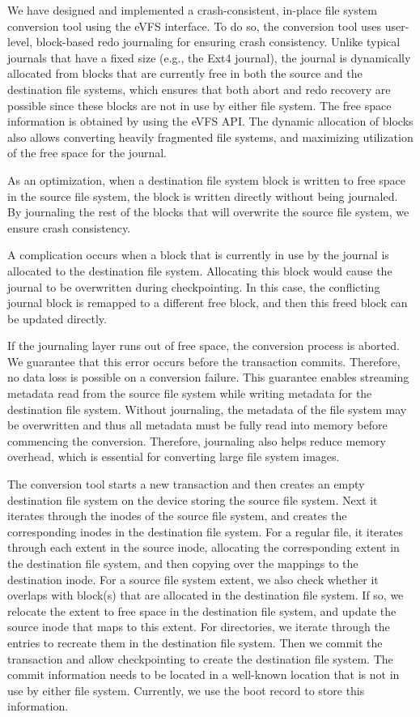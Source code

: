 We have designed and implemented a crash-consistent, in-place file system conversion tool using the eVFS interface. To do so, the conversion tool uses user-level, block-based redo journaling for ensuring crash consistency. Unlike typical journals that have a fixed size (e.g., the Ext4 journal), the journal is dynamically allocated from blocks that are currently free in both the source and the destination file systems, which ensures that both abort and redo recovery are possible since these blocks are not in use by either file system. The free space information is obtained by using the eVFS API. The dynamic allocation of blocks also allows converting heavily fragmented file systems, and maximizing utilization of the free space for the journal.

As an optimization, when a destination file system block is written to free space in the source file system, the block is written directly without being journaled. By journaling the rest of the blocks that will overwrite the source file system, we ensure crash consistency.

A complication occurs when a block that is currently in use by the journal is allocated to the destination file system. Allocating this block would cause the journal to be overwritten during checkpointing. In this case, the conflicting journal block is remapped to a different free block, and then this freed block can be updated directly.

If the journaling layer runs out of free space, the conversion process is aborted. We guarantee that this error occurs before the transaction commits. Therefore, no data loss is possible on a conversion failure. This guarantee enables streaming metadata read from the source file system while writing metadata for the destination file system. Without journaling, the metadata of the file system may be overwritten and thus all metadata must be fully read into memory before commencing the conversion. Therefore, journaling also helps reduce memory overhead, which is essential for converting large file system images.
 
The conversion tool starts a new transaction and then creates an empty destination file system on the device storing the source file system. Next it iterates through the inodes of the source file system, and creates the corresponding inodes in the destination file system. For a regular file, it iterates through each extent in the source inode, allocating the corresponding extent in the destination file system, and then copying over the mappings to the destination inode. For a source file system extent, we also check whether it overlaps with block(s) that are allocated in the destination file system. If so, we relocate the extent to free space in the destination file system, and update the source inode that maps to this extent. For directories, we iterate through the entries to recreate them in the destination file system. Then we commit the transaction and allow checkpointing to create the destination file system. The commit information needs to be located in a well-known location that is not in use by either file system. Currently, we use the boot record to store this information.

